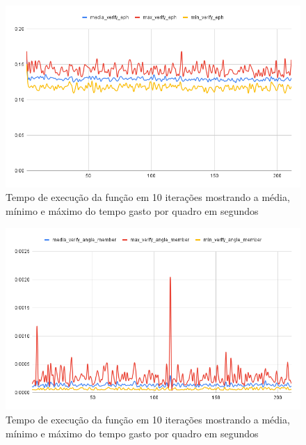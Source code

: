\begin{figure}[H]
	\centering
	\caption{Tempo de execução da função  em 10 iterações mostrando a média, mínimo e máximo do tempo gasto por quadro em segundos}
	\includegraphics[scale=0.5]{figuras/grafico/eph.png}
\end{figure}


\begin{figure}[H]
	\centering
	\caption{Tempo de execução da função  em 10 iterações mostrando a média, mínimo e máximo do tempo gasto por quadro em segundos}
	\includegraphics[scale=0.6]{figuras/grafico/angulo.png}
\end{figure}



